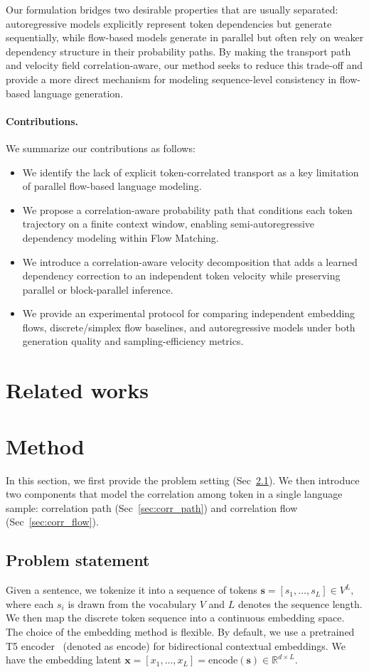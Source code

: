 \documentclass{article} %
\begin{document}
Our formulation bridges two desirable properties that are usually separated: autoregressive models explicitly represent token dependencies but generate sequentially, while flow-based models generate in parallel but often rely on weaker dependency structure in their probability paths. 
By making the transport path and velocity field correlation-aware, our method seeks to reduce this trade-off and provide a more direct mechanism for modeling sequence-level consistency in flow-based language generation.

\paragraph{Contributions.}
We summarize our contributions as follows:
\begin{itemize}
    \item We identify the lack of explicit token-correlated transport as a key limitation of parallel flow-based language modeling.
    \item We propose a correlation-aware probability path that conditions each token trajectory on a finite context window, enabling semi-autoregressive dependency modeling within Flow Matching.
    \item We introduce a correlation-aware velocity decomposition that adds a learned dependency correction to an independent token velocity while preserving parallel or block-parallel inference.
    \item We provide an experimental protocol for comparing independent embedding flows, discrete/simplex flow baselines, and autoregressive models under both generation quality and sampling-efficiency metrics.
\end{itemize}

\section{Related works}
\section{Method}
\label{sec:method}
In this section, we first provide the problem setting (Sec~\ref{sec:problem_statement}). We then introduce two components that model the correlation among token in a single language sample: correlation path (Sec~\ref{sec:corr_path}) and correlation flow (Sec~\ref{sec:corr_flow}). 

\subsection{Problem statement}
\label{sec:problem_statement}
Given a sentence, we tokenize it into a sequence of tokens $\mathbf{s} = [s_1, ..., s_{L}] \in V^{L},$ where each $s_i$ is drawn from the vocabulary $V$ and $L$ denotes the sequence length. We then map the discrete token sequence into a continuous
embedding space. The choice of the embedding method is flexible. By default, we use a pretrained T5 encoder~\citep{raffel2023exploringlimitstransferlearning} (denoted as $\text{encode}$) for bidirectional contextual embeddings. We have the embedding latent $\mathbf{x} = [x_1, ..., x_L] =\text{encode}(\mathbf{s}) \in \mathbb{R}^{d\times L}$.
\end{document}

